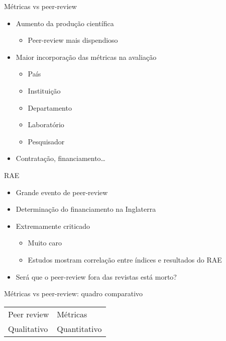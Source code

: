 \documentclass[bigger]{beamer}
\begin{document}
\begin{frame}[label={sec:orgea08783}]{Métricas vs peer-review}
\begin{itemize}
\item Aumento da produção científica
\begin{itemize}
\item Peer-review mais dispendioso
\end{itemize}

\item Maior incorporação das métricas na avaliação
\begin{itemize}
\item País
\item Instituição
\item Departamento
\item Laboratório
\item Pesquisador
\end{itemize}

\item Contratação, financiamento\ldots{}
\end{itemize}
\end{frame}

\begin{frame}[label={sec:orgd3421ed}]{RAE}
\begin{itemize}
\item Grande evento de peer-review
\item Determinação do financiamento na Inglaterra

\item Extremamente criticado
\begin{itemize}
\item Muito caro
\item Estudos mostram correlação entre índices e resultados do RAE
\end{itemize}

\item Será que o peer-review fora das revistas está morto?
\end{itemize}
\end{frame}

\begin{frame}[label={sec:org34f309a}]{Métricas vs peer-review: quadro comparativo}
\begin{center}
\begin{tabular}{ll}
Peer review & Métricas\\
Qualitativo & Quantitativo\\
\end{tabular}
\end{center}
\end{frame}
\end{document}
